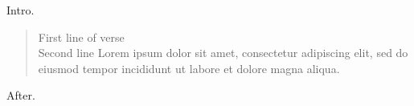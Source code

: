 \documentclass[12pt]{article}
\begin{document}
Intro.
\begin{verse}
First line of verse\\
Second line Lorem ipsum dolor sit amet, consectetur adipiscing elit, sed do eiusmod tempor incididunt ut labore et dolore magna aliqua.
\end{verse}
After.
\end{document}
